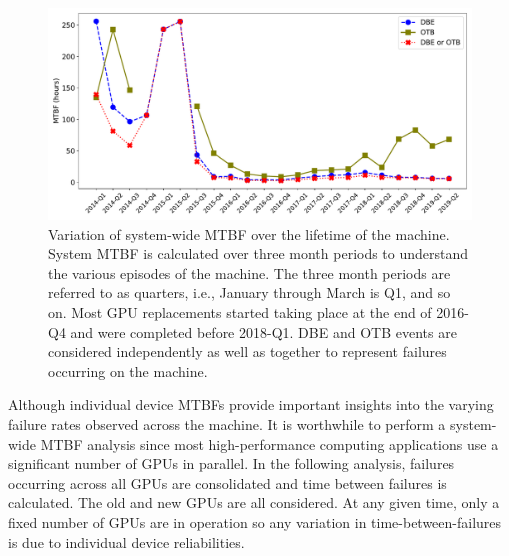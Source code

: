\begin{figure}[bt]
  \begin{center}
    \includegraphics[width=\columnwidth]{figs/MTBF_quaterly_sys.pdf}
  \end{center}
  \caption{Variation of system-wide MTBF over the lifetime of the machine. System MTBF is calculated over 
three month periods to understand the various episodes of the machine. The three month periods are 
referred to as quarters, i.e., January through March is Q1, and so on. Most GPU replacements started taking 
place at the end of 2016-Q4 and were completed before 2018-Q1. DBE and OTB events are 
considered independently as well as together to represent failures occurring on the machine.}
  \label{fig:MTBF_sys}
\end{figure}

Although individual device MTBFs provide important insights into the varying failure rates
observed across the machine. It is worthwhile to perform a system-wide MTBF analysis since 
most high-performance computing applications use a significant number of GPUs in parallel. 
In the following analysis, failures occurring across all GPUs are consolidated and time between failures
is calculated. The old and new GPUs are all considered. At any given time, only a fixed number of GPUs
are in operation so any variation in time-between-failures is due to individual device reliabilities.

